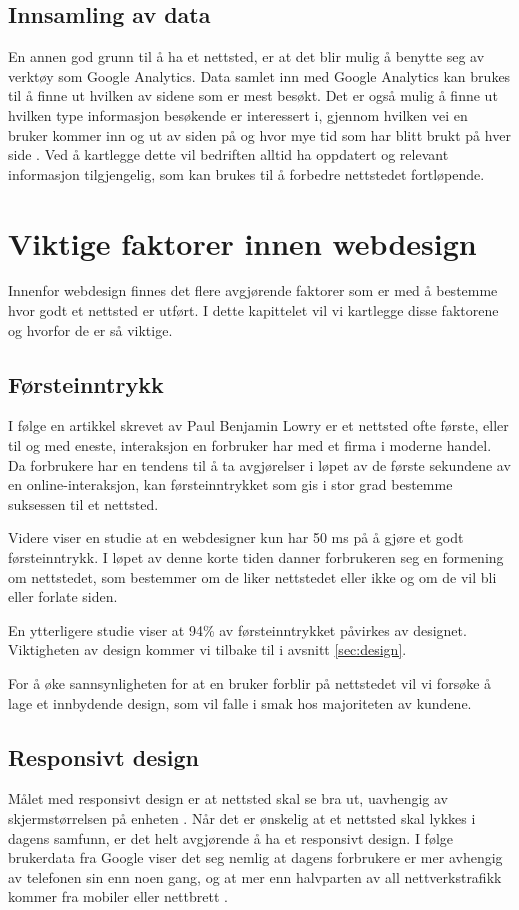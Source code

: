 \subsection{Innsamling av data}
En annen god grunn til å ha et nettsted, er at det blir mulig å benytte seg av verktøy som Google Analytics. Data samlet inn med Google Analytics kan brukes til å finne ut hvilken av sidene som er mest besøkt. Det er også mulig å finne ut hvilken type informasjon besøkende er interessert i, gjennom hvilken vei en bruker kommer inn og ut av siden på og hvor mye tid som har blitt brukt på hver side \cite{kent2011lwa}. Ved å kartlegge dette vil bedriften alltid ha oppdatert og relevant informasjon tilgjengelig, som kan brukes til å forbedre nettstedet fortløpende. 

\section{Viktige faktorer innen webdesign}
\label{sec:viktige-faktorer}
Innenfor webdesign finnes det flere avgjørende faktorer som er med å bestemme hvor godt et nettsted er utført. I dette kapittelet vil vi kartlegge disse faktorene og hvorfor de er så viktige.

\subsection{Førsteinntrykk}
I følge en artikkel skrevet av Paul Benjamin Lowry \cite{lowry2014pis} er et nettsted ofte første, eller til og med eneste, interaksjon en forbruker har med et firma i moderne handel. Da forbrukere har en tendens til å ta avgjørelser i løpet av de første sekundene av en online-interaksjon, kan førsteinntrykket som gis i stor grad bestemme suksessen til et nettsted. 

Videre viser en studie \cite{lindgaard2006awd} at en webdesigner kun har 50 ms på å gjøre et godt førsteinntrykk.
I løpet av denne korte tiden danner forbrukeren seg en formening om nettstedet, som bestemmer om de liker nettstedet eller ikke og om de vil bli eller forlate siden.

En ytterligere studie \cite{sillence2004tam} viser at 94\% av førsteinntrykket påvirkes av designet.
Viktigheten av design kommer vi tilbake til i avsnitt \ref{sec:design}.

For å øke sannsynligheten for at en bruker forblir på nettstedet vil vi forsøke å lage et innbydende design, som vil falle i smak hos majoriteten av kundene.

\subsection{Responsivt design}
Målet med responsivt design er at nettsted skal se bra ut, uavhengig av skjermstørrelsen på enheten \cite{kim2013rwd}. Når det er ønskelig at et nettsted skal lykkes i dagens samfunn, er det helt avgjørende å ha et responsivt design.  I følge brukerdata fra Google \cite{google16hms} viser det seg nemlig at dagens forbrukere er mer avhengig av telefonen sin enn noen gang, og at mer enn halvparten av all nettverkstrafikk kommer fra mobiler eller nettbrett . 

